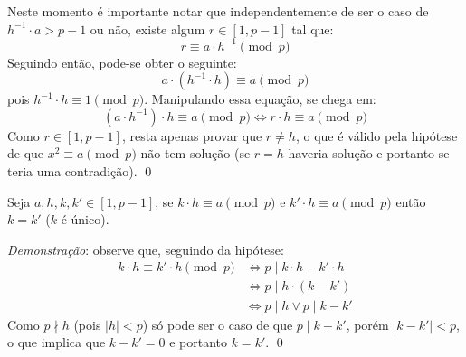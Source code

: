 Neste momento é importante notar que independentemente de ser o caso de $h^{-1} \cdot a > p - 1$ ou não, existe algum $r \in [1, p-1]$ tal que:
\begin{equation*}
    r \equiv a \cdot h^{-1} \pmod p
\end{equation*}
Seguindo então, pode-se obter o seguinte:
\begin{equation*}
    a \cdot (h^{-1} \cdot h) \equiv a \pmod p
\end{equation*}
pois $h^{-1} \cdot h \equiv 1 \pmod p$. Manipulando essa equação, se chega em:
\begin{equation*}
    (a \cdot h^{-1}) \cdot h \equiv a \pmod p \Longleftrightarrow r \cdot h \equiv a \pmod p
\end{equation*}
Como $r \in [1, p-1]$, resta apenas provar que $r \neq h$, o que é válido pela hipótese de que $x^2 \equiv a \pmod p$ não tem solução (se $r = h$ haveria solução e portanto se teria uma contradição). \qed

\begin{lema} \label{lema : kk'modp}
    Seja $a, h, k, k' \in [1, p-1]$, se $k \cdot h \equiv a \pmod{p}$ e $k' \cdot h \equiv a \pmod{p}$ então $k = k'$ ($k$ é único).
\end{lema}
\noindent
\textit{Demonstração}: observe que, seguindo da hipótese:
\begin{align*}
    k \cdot h \equiv k' \cdot h \pmod{p} 
    &
        \Longleftrightarrow p \mid k \cdot h - k' \cdot h
    \\
    &
        \Longleftrightarrow p \mid h \cdot (k - k')
    \\
    &
        \Longleftrightarrow p \mid h \lor p \mid k - k'
\end{align*}
Como $p \nmid h$ (pois $|h| < p$) só pode ser o caso de que $p \mid k - k'$, porém $|k - k'| < p$, o que implica que $k - k' = 0$ e portanto $k = k'$. \qed


